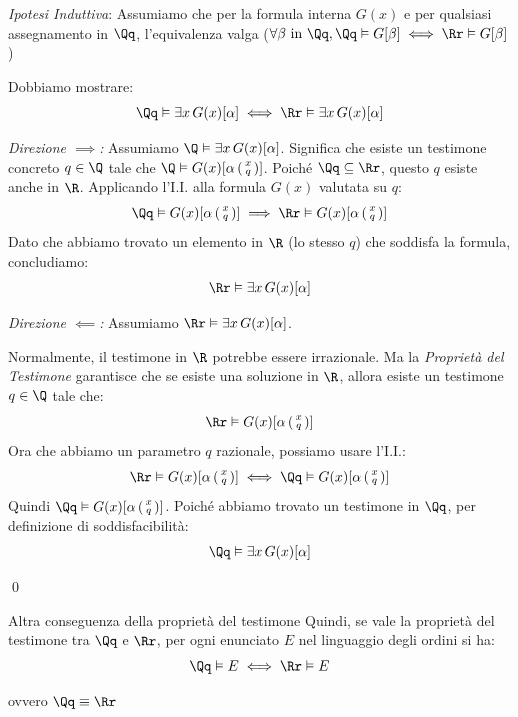 \documentclass[a4paper,11pt]{report}
\newcommand{\ass}[2]{%
    \left( \begin{smallmatrix} #1 \\ #2 \end{smallmatrix} \right)
}
\begin{document}
\begin{proofframe}{}{}
\begin{itemize}
            \textit{Ipotesi Induttiva}: Assumiamo che per la formula interna \( G(x) \) e per qualsiasi assegnamento in \( \Qq \), l'equivalenza valga (\( \forall \beta \text{ in } \Qq, \Qq \vDash G[\beta] \iff \Rr \vDash G[\beta] \))

        Dobbiamo mostrare:
        \[
        \Qq \vDash \exists x \, G(x)[\alpha] \iff \Rr \vDash \exists x \, G(x)[\alpha]
        \]

        \textit{Direzione \(\implies\):}
        Assumiamo \(\Q \vDash \exists x \, G(x)[\alpha]\).
        Significa che esiste un testimone concreto \(q \in \Q\) tale che \(\Q \vDash G(x)[\alpha\ass{x}{q}]\).
        Poiché \( \Qq \subseteq \Rr \), questo \( q \) esiste anche in \( \R \).
        Applicando l'I.I. alla formula \( G(x) \) valutata su \( q \):
        \[
            \Qq \vDash G(x)[\alpha \ass{x}{q}] \implies \Rr \vDash G(x)[\alpha \ass{x}{q}]
        \]
        Dato che abbiamo trovato un elemento in \( \R \) (lo stesso \( q \)) che soddisfa la formula, concludiamo:
        \[
            \Rr \vDash \exists x \, G(x)[\alpha]
        \]

        \textit{Direzione \(\impliedby\):}
        Assumiamo \(\Rr \vDash \exists x \, G(x)[\alpha]\).

        Normalmente, il testimone in \( \R \) potrebbe essere irrazionale. Ma la \textit{Proprietà del Testimone} garantisce che se esiste una soluzione in \( \R \), allora esiste un testimone \(q \in \Q\) tale che:
        \[
            \Rr \vDash G(x)[\alpha \ass{x}{q}]
        \]
        Ora che abbiamo un parametro \( q \) razionale, possiamo usare l'I.I.:
        \[
            \Rr \vDash G(x)[\alpha\ass{x}{q}] \iff \Qq \vDash G(x)[\alpha\ass{x}{q}]
        \]
        Quindi \(\Qq \vDash G(x)[\alpha\ass{x}{q}]\). Poiché abbiamo trovato un testimone in \( \Qq \), per definizione di soddisfacibilità:
        \[
            \Qq \vDash \exists x \, G(x)[\alpha]
        \]

    \end{itemize}
    \qed
\end{proofframe}

\begin{corframe}{Altra conseguenza della proprietà del testimone}
    Quindi, se vale la proprietà del testimone tra \( \Qq \) e \( \Rr \), per ogni enunciato \( E \) nel linguaggio degli ordini si ha:
    \[ \Qq \vDash E \iff \Rr \vDash E \]

    ovvero \( \Qq \equiv \Rr \)
\end{corframe}
\end{document}
